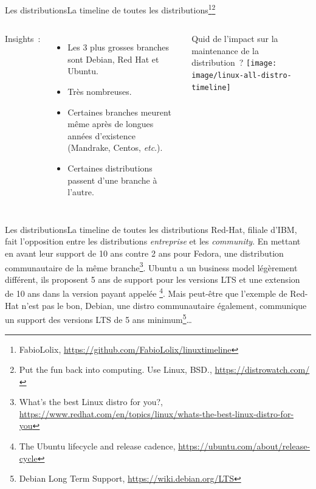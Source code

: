 \documentclass{beamer}
\begin{document}
    \begin{frame}{Les distributions}{La timeline de toutes les distributions\footnote{FabioLolix, \url{https://github.com/FabioLolix/linuxtimeline}}\footnotestep\footnote{Put the fun back into computing. Use Linux, BSD., \url{https://distrowatch.com/}}}
        \begin{columns}
            Insights~:
            \begin{itemize}
                \item Les 3 plus grosses branches sont Debian, Red Hat et Ubuntu.
                \item Très nombreuses.
                \item Certaines branches meurent même après de longues années d'existence (Mandrake, Centos, \textit{etc}.).
                \item Certaines distributions passent d'une branche à l'autre.
            \end{itemize}
            Quid de l'impact sur la maintenance de la distribution~?
            \centering
            \texttt{[image: image/linux-all-distro-timeline]}
        \end{columns}
    \end{frame}

    \begin{frame}{Les distributions}{La timeline de toutes les distributions}
        Red-Hat, filiale d'IBM, fait l'opposition entre les distributions \textit{entreprise} et les \textit{community}.
        En mettant en avant leur support de 10 ans contre 2 ans pour Fedora, une distribution communautaire de la même branche\footnote{What's the best Linux distro for you?, \url{https://www.redhat.com/en/topics/linux/whats-the-best-linux-distro-for-you}}.
        \bigbreak
        Ubuntu a un business model légèrement différent, ils proposent 5 ans de support pour les versions LTS et une extension de 10 ans dans la version payant appelée \footnote{The Ubuntu lifecycle and release cadence, \url{https://ubuntu.com/about/release-cycle}}.
        \bigbreak
        Mais peut-être que l'exemple de Red-Hat n'est pas le bon, Debian, une distro communautaire également, communique un support des versions LTS de 5 ans minimum\footnote{Debian Long Term Support, \url{https://wiki.debian.org/LTS}}\ldots
    \end{frame}
\end{document}
